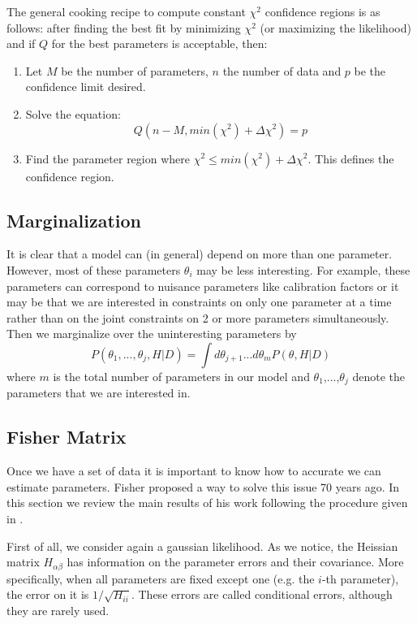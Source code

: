 \documentclass[onecolumn,           %
               showpacs,            %
               preprintnumbers,     %
               aps,                 %
               letterpaper,             %
               superscriptaddress,      %
               nofootinbib,         %
               tightenlines,        %
               floats,floatfix      %
               ,usenatbib,
               ]{revtex4-1}
\begin{document}
The general cooking recipe to compute constant $\chi^2$ confidence regions is as follows: after finding the best fit by minimizing $\chi^2$ (or maximizing the likelihood) and if $Q$ for the best parameters is acceptable, then:
\begin{enumerate}
\item Let $M$ be the number of parameters, $n$ the number of data and $p$ be the confidence limit desired.
\item Solve the equation:
\begin{equation}
Q(n-M,min(\chi^2)+\Delta\chi^2)=p
\end{equation}
\item Find the parameter region where $\chi^2\leq min(\chi^2)+\Delta\chi^2$. This defines the confidence region.
\end{enumerate}
\subsection{Marginalization}

It is clear that a model can (in general) depend on more than one parameter. However, most of these parameters $\theta_i$ may be less interesting. For example, these parameters can correspond to nuisance parameters like calibration factors or it may be that we are interested in constraints on only one parameter at a time rather than on the joint constraints on 2 or more parameters simultaneously. Then we marginalize over the uninteresting parameters by
\begin{equation}
P(\theta_1,...,\theta_j,H|D)=\int d\theta_{j+1}...d\theta_{m}P(\theta,H|D)
\end{equation}
where $m$ is the total number of parameters in our model and $\theta_1$,...,$\theta_j$ denote the parameters that we are interested in.

\subsection{Fisher Matrix}

Once we have a set of data it is important to know how to accurate we can estimate parameters. Fisher \cite{Fisher} proposed a way to solve this issue 70 years ago. In this section we review the main results of his work following the procedure given in \cite{LiV}.

First of all, we consider again a gaussian likelihood. As we notice, the Heissian matrix $H_{\alpha\beta}$ has information on the parameter errors and their covariance. More specifically, when all parameters are fixed except one (e.g. the $i$-th parameter), the error on it is $1/\sqrt{H_{ii}}$. These errors are called conditional errors, although they are rarely used.
\end{document}
